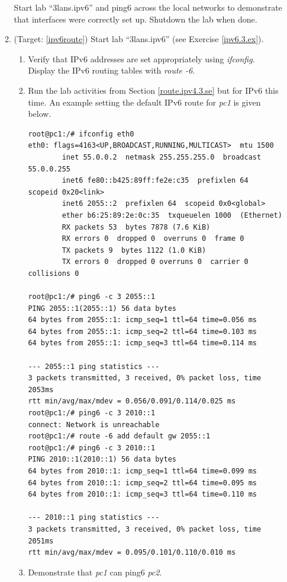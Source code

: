 \documentclass[12pt]{book}
\begin{document}
\begin{enumerate}[label=\arabic*.]
\begin{enumerate}
  Start lab ``3lans.ipv6'' and ping6 across the local networks to demonstrate that interfaces were correctly set up. Shutdown the lab when done.

\item (Target: \ref{ipv6route}) Start lab ``3lans.ipv6'' (see Exercise \ref{ipv6.3.ex}).
  \begin{enumerate}[label=(\alph*)]
  \item Verify that IPv6 addresses are set appropriately using \emph{ifconfig}. Display the IPv6 routing tables with \emph{route -6}.
  \item Run the lab activities from Section \ref{route.ipv4.3.se} but for IPv6 this time. An example setting the default IPv6 route for \emph{pc1} is given below.
    \begin{lstlisting}
root@pc1:/# ifconfig eth0
eth0: flags=4163<UP,BROADCAST,RUNNING,MULTICAST>  mtu 1500
        inet 55.0.0.2  netmask 255.255.255.0  broadcast 55.0.0.255
        inet6 fe80::b425:89ff:fe2e:c35  prefixlen 64  scopeid 0x20<link>
        inet6 2055::2  prefixlen 64  scopeid 0x0<global>
        ether b6:25:89:2e:0c:35  txqueuelen 1000  (Ethernet)
        RX packets 53  bytes 7878 (7.6 KiB)
        RX errors 0  dropped 0  overruns 0  frame 0
        TX packets 9  bytes 1122 (1.0 KiB)
        TX errors 0  dropped 0 overruns 0  carrier 0  collisions 0

root@pc1:/# ping6 -c 3 2055::1
PING 2055::1(2055::1) 56 data bytes
64 bytes from 2055::1: icmp_seq=1 ttl=64 time=0.056 ms
64 bytes from 2055::1: icmp_seq=2 ttl=64 time=0.103 ms
64 bytes from 2055::1: icmp_seq=3 ttl=64 time=0.114 ms

--- 2055::1 ping statistics ---
3 packets transmitted, 3 received, 0% packet loss, time 2053ms
rtt min/avg/max/mdev = 0.056/0.091/0.114/0.025 ms
root@pc1:/# ping6 -c 3 2010::1
connect: Network is unreachable
root@pc1:/# route -6 add default gw 2055::1
root@pc1:/# ping6 -c 3 2010::1
PING 2010::1(2010::1) 56 data bytes
64 bytes from 2010::1: icmp_seq=1 ttl=64 time=0.099 ms
64 bytes from 2010::1: icmp_seq=2 ttl=64 time=0.095 ms
64 bytes from 2010::1: icmp_seq=3 ttl=64 time=0.110 ms

--- 2010::1 ping statistics ---
3 packets transmitted, 3 received, 0% packet loss, time 2051ms
rtt min/avg/max/mdev = 0.095/0.101/0.110/0.010 ms
    \end{lstlisting}
    
  \item Demonstrate that \emph{pc1} can ping6 \emph{pc2}.
  \end{enumerate}
\end{enumerate}

\end{enumerate}



 
\end{document}
